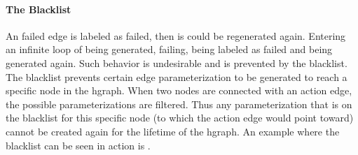 \paragraph{The Blacklist}%
An failed edge is labeled as failed, then is could be regenerated again. Entering an infinite loop of being generated, failing, being labeled as failed and being generated again. Such behavior is undesirable and is prevented by the blacklist. The blacklist prevents certain edge parameterization to be generated to reach a specific node in the \ac{hgraph}. When two nodes are connected with an action edge, the possible parameterizations are filtered. Thus any parameterization that is on the blacklist for this specific node (to which the action edge would point toward) cannot be created again for the lifetime of the \ac{hgraph}. An example where the blacklist can be seen in action is .\bs

